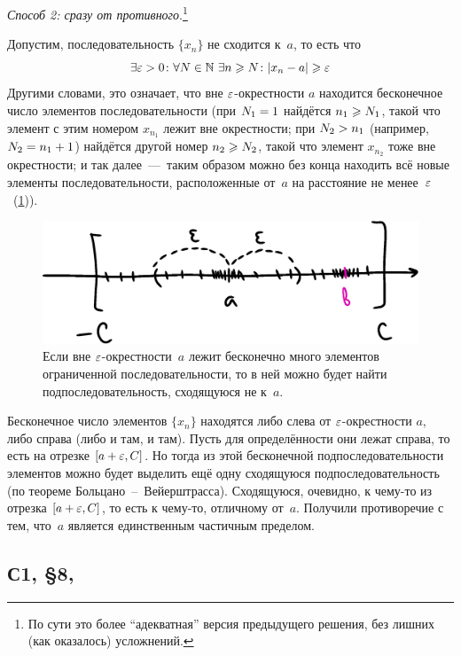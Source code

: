 \documentclass[a4paper,12pt]{article}
\begin{document}
\begin{solution}
    \medskip
    
    \emph{Способ 2: сразу от противного}.\footnote{
      По сути это более ``адекватная'' версия предыдущего решения, без лишних (как оказалось) усложнений.
    }
    
    Допустим, последовательность $\{x_n\}$ не сходится к~$a$, то есть что
    \[
      \exists \varepsilon > 0\colon \forall N \in \mathbb N\ \exists n \geqslant N\colon |x_n - a| \geqslant \varepsilon
    \]
    Другими словами, это означает, что вне $\varepsilon$-окрестности $a$ находится бесконечное число элементов последовательности (при $N_1 \hm= 1$ найдётся $n_1 \hm\geq N_1$, такой что элемент с этим номером $x_{n_1}$ лежит вне окрестности; при $N_2 \hm> n_1$ (например, $N_2 \hm= n_1 \hm+ 1$) найдётся другой номер $n_2 \hm\geq N_2$, такой что элемент $x_{n_2}$ тоже вне окрестности; и так далее~---~таким образом можно без конца находить всё новые элементы последовательности, расположенные от~$a$ на расстояние не менее~$\varepsilon$~(\ref{fig:infty-far-from-a})).
    
    \begin{figure}[ht]
      \centering
      \includegraphics[width=0.6\linewidth]{images/infty-far-from-a}
      
      \caption{
        Если вне $\varepsilon$-окрестности~$a$ лежит бесконечно много элементов ограниченной последовательности, то в ней можно будет найти подпоследовательность, сходящуюся не к~$a$.
      }
      \label{fig:infty-far-from-a}
    \end{figure}
    
    Бесконечное число элементов $\{x_n\}$ находятся либо слева от $\varepsilon$-окрестности $a$, либо справа (либо и там, и там).
    Пусть для определённости они лежат справа, то есть на отрезке $[a \hm+ \eps, C]$.
    Но тогда из этой бесконечной подпоследовательности элементов можно будет выделить ещё одну сходящуюся подпоследовательность (по теореме Больцано~--~Вейерштрасса).
    Сходящуюся, очевидно, к чему-то из отрезка $[a \hm+ \eps, C]$, то есть к чему-то, отличному от~$a$.
    Получили противоречие с тем, что~$a$ является единственным частичным пределом.
    
  \end{solution}
  
  
  \subsection{С1, \S 8, }
  
\end{document}
